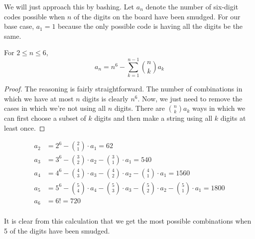 \documentclass[10pt]{../usamts}
\begin{document}

\begin{solution}
We will just approach this by bashing. Let $a_n$ denote the number of six-digit codes possible when $n$ of the digits on the board have been smudged.
For our base case, $a_1 = 1$ because the only possible code is having all the digits be the same.

\begin{claim}
    For $2 \le n \le 6$,
    $$a_n = n^6 - \sum_{k=1}^{n-1} \binom{n}{k} a_k$$
\end{claim}
\begin{proof}
    The reasoning is fairly straightforward. The number of combinations in which we have at most $n$ digits is clearly $n^6$. Now, we just need to remove the cases in which we're not using all $n$ digits. There are $\binom{n}{k} a_k$ ways in which we can first choose a subset of $k$ digits and then make a string using all $k$ digits at least once.
\end{proof}
\begin{align*}
a_2 &= 2^6 - \binom{2}{1} \cdot a_1 = 62\\
a_3 &= 3^6 - \binom{3}{2} \cdot a_2 - \binom{3}{1} \cdot a_1 = 540\\
a_4 &= 4^6 - \binom{4}{3}\cdot a_3 - \binom{4}{2} \cdot a_2 - \binom{4}{1} \cdot a_1 = 1560\\
a_5 &= 5^6 - \binom{5}{4}\cdot a_4 - \binom{5}{3}\cdot a_3 - \binom{5}{2} \cdot a_2 - \binom{5}{1} \cdot a_1 = 1800\\
a_6 &= 6! = 720 \tag{shortcutting go brrr}\\
\end{align*}

It is clear from this calculation that we get the most possible combinations when 5 of the digits have been smudged.

\end{solution}
\end{document}
